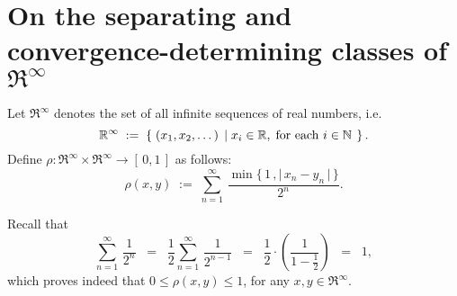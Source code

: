 

\section{On the separating and convergence-determining classes of $\Re^{\infty}$}
\setcounter{theorem}{0}
\setcounter{equation}{0}

\renewcommand{\theenumi}{\roman{enumi}}
\renewcommand{\labelenumi}{\textnormal{(\theenumi)}$\;\;$}

\begin{definition}
\label{RInfinityMetricSpace}
\mbox{}\vskip 0.1cm
\noindent
Let $\Re^{\infty}$ denotes the set of all infinite sequences of real numbers, i.e.
\begin{equation*}
\mathbb{R}^{\infty}
\; := \;
\left\{\;
(x_{1},x_{2},\ldots\,)
\;\left\vert\;
x_{i} \in \mathbb{R},\;\textnormal{for each $i \in \mathbb{N}$}
\right.
\;\right\}.
\end{equation*}
Define $\rho : \Re^{\infty} \times \Re^{\infty} \longrightarrow [\,0,1\,]$ as follows:
\begin{equation*}
\rho(x,y)
\; := \;
\sum_{n=1}^{\infty}\,\dfrac{\min\{\,1\,,\vert\,x_{n}-y_{n}\,\vert\,\}}{2^{n}}.
\end{equation*}
\end{definition}

\begin{remark}
Recall that
\begin{equation*}
\sum_{n=1}^{\infty}\,\dfrac{1}{2^{n}}
\;\;=\;\; \dfrac{1}{2} \sum_{n=1}^{\infty}\,\dfrac{1}{2^{n-1}}
\;\;=\;\; \dfrac{1}{2}\cdot\left(\dfrac{1}{1 - \frac{1}{2}}\right)
\;\;=\;\; 1,
\end{equation*}
which proves indeed that $0 \leq \rho(x,y) \leq 1$, for any $x, y \in \Re^{\infty}$.
\end{remark}

